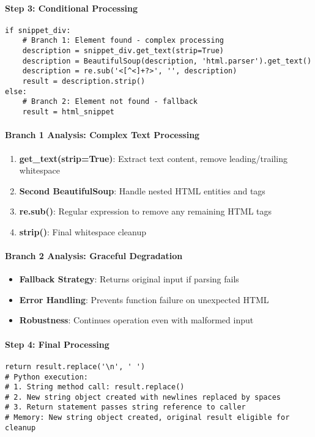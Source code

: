 \paragraph{Step 3: Conditional Processing}
\begin{lstlisting}[caption=Conditional Text Extraction]
if snippet_div:
    # Branch 1: Element found - complex processing
    description = snippet_div.get_text(strip=True)
    description = BeautifulSoup(description, 'html.parser').get_text()
    description = re.sub('<[^<]+?>', '', description)
    result = description.strip()
else:
    # Branch 2: Element not found - fallback
    result = html_snippet
\end{lstlisting}

\paragraph{Branch 1 Analysis: Complex Text Processing}
\begin{enumerate}
\item \textbf{get\_text(strip=True)}: Extract text content, remove leading/trailing whitespace
\item \textbf{Second BeautifulSoup}: Handle nested HTML entities and tags
\item \textbf{re.sub()}: Regular expression to remove any remaining HTML tags
\item \textbf{strip()}: Final whitespace cleanup
\end{enumerate}

\paragraph{Branch 2 Analysis: Graceful Degradation}
\begin{itemize}
\item \textbf{Fallback Strategy}: Returns original input if parsing fails
\item \textbf{Error Handling}: Prevents function failure on unexpected HTML
\item \textbf{Robustness}: Continues operation even with malformed input
\end{itemize}

\paragraph{Step 4: Final Processing}
\begin{lstlisting}[caption=Newline Normalization]
return result.replace('\n', ' ')
# Python execution:
# 1. String method call: result.replace()
# 2. New string object created with newlines replaced by spaces
# 3. Return statement passes string reference to caller
# Memory: New string object created, original result eligible for cleanup
\end{lstlisting}

